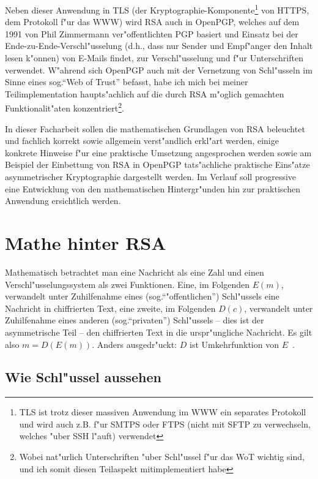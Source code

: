 \documentclass[12pt]{article}
\begin{document}
Neben dieser Anwendung in TLS (der Kryptographie-Komponente\footnote{
TLS ist trotz dieser massiven Anwendung im WWW ein separates Protokoll und wird auch z.B. f"ur SMTPS oder FTPS (nicht mit SFTP zu verwechseln, welches "uber SSH l"auft) verwendet}
von HTTPS, dem Protokoll f"ur das WWW) wird RSA auch in OpenPGP,
welches auf dem 1991 von Phil Zimmermann ver"offentlichten PGP basiert und Einsatz bei der Ende-zu-Ende-Verschl"usselung
(d.h., dass nur Sender und Empf"anger den Inhalt lesen k"on\-nen)
von E-Mails findet, zur Verschl"usselung und f"ur Unterschriften verwendet.
W"ah\-rend sich OpenPGP auch mit der Vernetzung von Schl"usseln im Sinne eines sog.\@ "`Web of Trust"' befasst,
habe ich mich bei meiner Teilimplementation haupts"achlich auf die durch RSA m"oglich gemachten
Funktionalit"aten konzentriert\footnote{Wobei nat"urlich Unterschriften "uber Schl"ussel f"ur das WoT wichtig sind, und ich somit diesen Teilaspekt mitimplementiert habe}.

In dieser Facharbeit sollen die mathematischen Grundlagen von RSA beleuchtet und
fachlich korrekt sowie allgemein verst"andlich erkl"art werden,
einige konkrete Hinweise f"ur eine praktische Umsetzung angesprochen werden
sowie am Beispiel der Einbettung von RSA in OpenPGP tats"achliche praktische
Eins"atze asymmetrischer Kryptographie dargestellt werden.
Im Verlauf soll progressive eine Entwicklung von den mathematischen Hintergr"unden
hin zur praktischen Anwendung ersichtlich werden.

\section{Mathe hinter RSA}

Mathematisch betrachtet man eine Nachricht als eine Zahl und einen
Ver\-schl"us\-sel\-ungs\-sys\-tem als zwei Funktionen.
Eine, im Folgenden $E(m)$, verwandelt unter Zuhilfenahme eines (sog.\@ "`"offentlichen"') Schl"ussels eine
Nachricht in chiffrierten Text, eine zweite, im Folgenden $D(c)$,
verwandelt unter Zuhilfenahme eines anderen (sog.\@ "`privaten"') Schl"ussels -- dies ist der asymmetrische Teil --
den chiffrierten Text in die urspr"ungliche Nachricht.
Es gilt also $m = D(E(m))$.
Anders ausgedr"uckt: $D$ ist Umkehrfunktion von $E$~\cite{rsa}.

\subsection{Wie Schl"ussel aussehen}
\label{subsec:rsa:keys}
\end{document}

